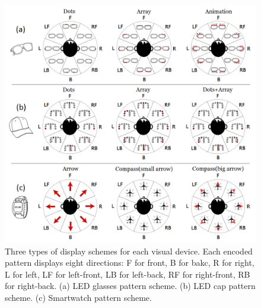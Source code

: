 \documentclass{sigchi}
\begin{document}
\begin{figure}[!t]
\centering
\includegraphics[width=2.0\columnwidth]{visual_pattern_combine}
\caption{Three types of display schemes for each visual device. Each encoded pattern displays eight directions: F for front, B for bakc, R for right, L for left, LF for left-front, LB for left-back, RF for right-front, RB for right-back. (a) LED glasses pattern scheme. (b) LED cap pattern scheme. (c) Smartwatch pattern scheme.}
\label{fig:visual_scheme}
\end{figure}

%
%

\end{document}
